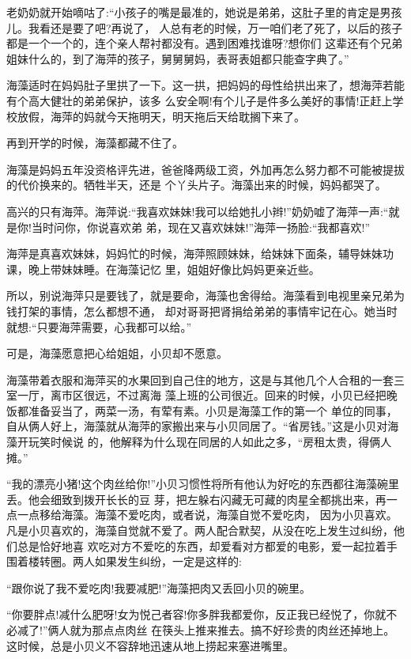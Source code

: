 \documentclass[11pt,a4paper,onecolumn]{article}
\begin{document}
老奶奶就开始嘀咕了:``小孩子的嘴是最准的，她说是弟弟，这肚子里的肯定是男孩儿。我看还是要了吧?再说了，
人总有老的时候，万一咱们老了死了，以后的孩子都是一个一个的，连个亲人帮衬都没有。遇到困难找谁呀?想你们
这辈还有个兄弟姐妹什么的，到了海萍的孩子，舅舅舅妈，表哥表姐都只能查字典了。''

海藻适时在妈妈肚子里拱了一下。这一拱，把妈妈的母性给拱出来了，想海萍若能有个高大健壮的弟弟保护，该多
么安全啊!有个儿子是件多么美好的事情!正赶上学校放假，海萍的妈就今天拖明天，明天拖后天给耽搁下来了。

再到开学的时候，海藻都藏不住了。

海藻是妈妈五年没资格评先进，爸爸降两级工资，外加再怎么努力都不可能被提拔的代价换来的。牺牲半天，还是
个丫头片子。海藻出来的时候，妈妈都哭了。

高兴的只有海萍。海萍说:``我喜欢妹妹!我可以给她扎小辫!''奶奶嘘了海萍一声:``就是你!当时问你，你说喜欢弟
弟，现在又喜欢妹妹!''海萍一扬脸:``我都喜欢!''

海萍是真喜欢妹妹，妈妈忙的时候，海萍照顾妹妹，给妹妹下面条，辅导妹妹功课，晚上带妹妹睡。在海藻记忆
里，姐姐好像比妈妈更亲近些。

所以，别说海萍只是要钱了，就是要命，海藻也舍得给。海藻看到电视里亲兄弟为钱打架的事情，怎么都想不通，
却对哥哥把肾捐给弟弟的事情牢记在心。她当时就想:``只要海萍需要，心我都可以给。''

可是，海藻愿意把心给姐姐，小贝却不愿意。

海藻带着衣服和海萍买的水果回到自己住的地方，这是与其他几个人合租的一套三室一厅，离市区很远，不过离海
藻上班的公司很近。回来的时候，小贝已经把晚饭都准备妥当了，两菜一汤，有荤有素。小贝是海藻工作的第一个
单位的同事，自从俩人好上，海藻就从海萍的家搬出来与小贝同居了。``省房钱。''这是小贝对海藻开玩笑时候说
的，他解释为什么现在同居的人如此之多，``房租太贵，得俩人摊。''

``我的漂亮小猪!这个肉丝给你!''小贝习惯性将所有他认为好吃的东西都往海藻碗里丢。他会细致到拨开长长的豆
芽，把左躲右闪藏无可藏的肉星全都挑出来，再一点一点移给海藻。海藻不爱吃肉，或者说，海藻自觉不爱吃肉，
因为小贝喜欢。凡是小贝喜欢的，海藻自觉就不爱了。两人配合默契，从没在吃上发生过纠纷，他们总是恰好地喜
欢吃对方不爱吃的东西，却爱看对方都爱的电影，爱一起拉着手围着楼转圈。两人如果发生纠纷，一定是这样的:

``跟你说了我不爱吃肉!我要减肥!''海藻把肉又丢回小贝的碗里。

``你要胖点!减什么肥呀!女为悦己者容!你多胖我都爱你，反正我已经悦了，你就不必减了!''俩人就为那点点肉丝
在筷头上推来推去。搞不好珍贵的肉丝还掉地上。这时候，总是小贝义不容辞地迅速从地上捞起来塞进嘴里。
\end{document}
